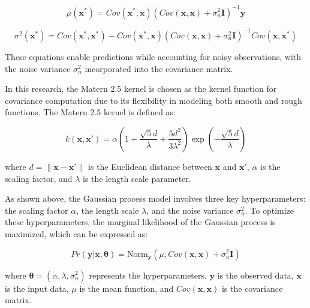 \documentclass[a4paper,fleqn,numbers,sort&compress]{cas-sc}
\begin{document}
\begin{equation}
\label{eq:mean-prediction-noise}
    \mu(\boldsymbol{x^*}) = Cov(\boldsymbol{x^*}, \boldsymbol{x}) \left( Cov(\boldsymbol{x}, \boldsymbol{x}) + \sigma_n^2 \mathbf{I} \right)^{-1} \boldsymbol{y}
\end{equation}

\begin{equation}
\label{eq:variance-prediction-noise}
    \sigma^2(\boldsymbol{x^*}) = Cov(\boldsymbol{x^*}, \boldsymbol{x^*}) - Cov(\boldsymbol{x^*}, \boldsymbol{x}) \left( Cov(\boldsymbol{x}, \boldsymbol{x}) + \sigma_n^2 \mathbf{I} \right)^{-1} Cov(\boldsymbol{x},\boldsymbol{x^*})
\end{equation}

These equations enable predictions while accounting for noisy observations, with the noise variance \( \sigma_n^2 \) incorporated into the covariance matrix.

In this research, the Matern 2.5 kernel is chosen as the kernel function for covariance computation due to its flexibility in modeling both smooth and rough functions. The Matern 2.5 kernel is defined as:

\begin{equation}
\label{eq:matern-2.5-kernel}
k(\boldsymbol{x}, \boldsymbol{x'}) = \alpha \left( 1 + \frac{\sqrt{5} d}{\lambda} + \frac{5 d^2}{3 \lambda^2} \right) \exp\left(-\frac{\sqrt{5} d}{\lambda}\right)
\end{equation}

where $ d = \|\boldsymbol{x} - \boldsymbol{x'}\| $ is the Euclidean distance between $ \boldsymbol{x} $ and $ \boldsymbol{x'} $, $ \alpha $ is the scaling factor, and $ \lambda $ is the length scale parameter.

As shown above, the Gaussian process model involves three key hyperparameters: the scaling factor $ \alpha $, the length scale $ \lambda $, and the noise variance $ \sigma_n^2 $. To optimize these hyperparameters, the marginal likelihood of the Gaussian process is maximized, which can be expressed as:

\begin{equation}
\label{eq:marginal-likelihood}
    Pr(\boldsymbol{y}|\boldsymbol{x}, \boldsymbol{\theta}) = \text{Norm}_{\boldsymbol{y}}(\mu, Cov(\boldsymbol{x}, \boldsymbol{x}) + \sigma_n^2 \mathbf{I})
\end{equation}

where $ \boldsymbol{\theta} = (\alpha, \lambda, \sigma_n^2) $ represents the hyperparameters, $ \boldsymbol{y} $ is the observed data, $ \boldsymbol{x} $ is the input data, $ \mu $ is the mean function, and $ Cov(\boldsymbol{x}, \boldsymbol{x}) $ is the covariance matrix.
\end{document}
